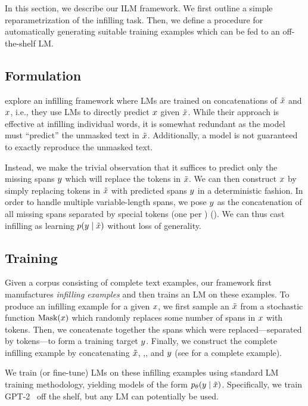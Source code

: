 In this section, we describe our ILM framework. 
We first outline a simple reparametrization of the infilling task. 
Then, we define a procedure for automatically generating suitable training examples which can be fed to an off-the-shelf LM.

\subsection{Formulation}\label{sec:formulation}

\citet{fedus2018maskgan} explore an infilling framework where LMs are trained on concatenations of $\tilde{x}$ and $x$, i.e., they use LMs to directly predict $x$ given $\tilde{x}$. 
While their approach is effective at infilling individual words, 
it is somewhat redundant as the model must ``predict'' the unmasked text in $\tilde{x}$. 
Additionally, a model is not guaranteed to exactly reproduce the unmasked text.

Instead, 
we make the trivial observation that it suffices to predict only the missing spans $y$ which will replace the \blank{} tokens in $\tilde{x}$. 
We can then construct $x$ by simply replacing \blank{} tokens in $\tilde{x}$ with predicted spans $y$ in a deterministic fashion. 
In order to handle multiple variable-length spans, we pose $y$ as the concatenation of all missing spans separated by special \answer{} tokens (one \answer{} per \blank{}) (). 
We can thus cast infilling as learning $p(y \mid \tilde{x})$ without loss of generality.

\subsection{Training}\label{sec:training}

Given a corpus consisting of complete text examples,
our framework first manufactures \emph{infilling examples} 
and then trains an LM on these examples. 
To produce an infilling example for a given $x$, 
we first sample an $\tilde{x}$ from a stochastic function $\text{Mask}(x)$ which randomly replaces some number of spans in $x$ with \blank{} tokens. 
Then, we concatenate together the spans which were replaced---separated by \answer{} tokens---to form a training target $y$.
Finally, we construct the complete infilling example by concatenating $\tilde{x}$, \sep{}, and $y$ (see  for a complete example).

We train (or fine-tune) LMs on these infilling examples using standard LM training methodology, yielding models of the form $p_{\theta}(y \mid \tilde{x})$. 
Specifically, we train GPT-2~\citep{radford2019language} off the shelf, but any LM can potentially be used. 

